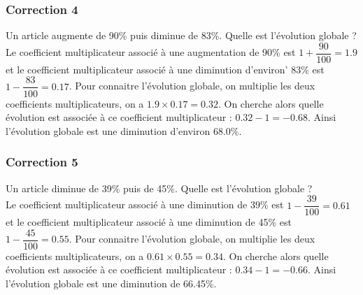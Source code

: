 \documentclass[15pt, mathserif]{beamer}
\begin{document}
\begin{frame}
\vspace{-10mm}
	\frametitle{Correction 4}
\vspace*{1cm} Un article augmente de 90\% puis diminue de 83\%. Quelle est l'évolution globale ? \\ Le coefficient multiplicateur associé à une augmentation de 90\% est $1+\dfrac{90}{100} = 1.9$ et le coefficient multiplicateur associé à une diminution d'environ' 83\% est $1-\dfrac{83}{100} = 0.17$. Pour connaitre l'évolution globale, on multiplie les deux coefficients multiplicateurs, on a $ 1.9 \times 0.17=0.32$. On cherche alors quelle évolution est associée à ce coefficient multiplicateur : $0.32-1 =-0.68$. Ainsi l'évolution globale est une diminution d'environ 68.0\%. 
 \begin{center} 
 \end{center}\end{frame}


\begin{frame}
\vspace{-10mm}
	\frametitle{Correction 5}
\vspace*{1cm} Un article diminue de 39\% puis de 45\%. Quelle est l'évolution globale ? \\ Le coefficient multiplicateur associé à une diminution de 39\% est $1-\dfrac{39}{100} = 0.61$ et le coefficient multiplicateur associé à une diminution de 45\% est $1-\dfrac{45}{100} = 0.55$. Pour connaitre l'évolution globale, on multiplie les deux coefficients multiplicateurs, on a $ 0.61 \times 0.55=0.34$. On cherche alors quelle évolution est associée à ce coefficient multiplicateur : $0.34-1 =-0.66$. Ainsi l'évolution globale est une diminution de 66.45\%. 
 \begin{center} 
 \end{center}\end{frame}
\end{document}
